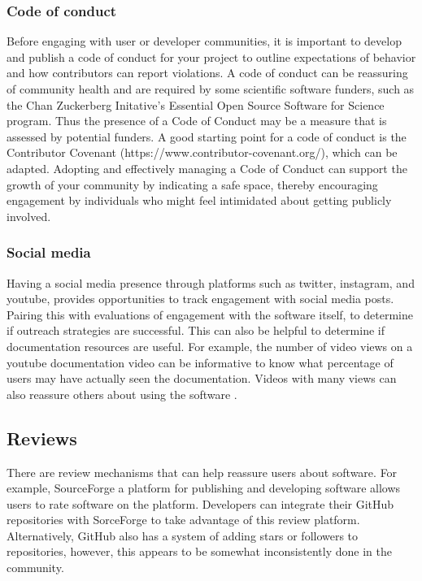 \subsubsection{Code of conduct}
Before engaging with user or developer communities, it is important to develop and publish a code of conduct for your project to outline expectations of behavior and how contributors can report violations. A code of conduct can be reassuring of community health and are required by some scientific software funders, such as the Chan Zuckerberg Initative’s Essential Open Source Software for Science program. Thus the presence of a Code of Conduct may be a measure that is assessed by potential funders. A good starting point for a code of conduct is the Contributor Covenant (https://www.contributor-covenant.org/), which can be adapted. Adopting and effectively managing\cite{aurora_how_2019} a  Code of Conduct can support the growth of your community by indicating a safe space, thereby encouraging engagement by individuals who might feel intimidated about getting publicly involved.

\subsubsection{Social media}
Having a social media presence through platforms such as twitter, instagram, and youtube, provides opportunities to track engagement with social media posts.  Pairing this with evaluations of engagement with the software itself, to determine if outreach strategies are successful. This can also be helpful to determine if documentation resources are useful. For example, the number of video views on a youtube documentation video can be informative to know what percentage of users may have actually seen the documentation. Videos with many views can also reassure others about using the software . 

\subsection{Reviews}
There are review mechanisms that can help reassure users about software. For example, SourceForge\cite{sourceforge} a platform for publishing and developing software allows users to rate software on the platform. Developers can integrate their GitHub repositories with SorceForge to take advantage of this review platform. Alternatively, GitHub also has a system of adding stars or followers to repositories, however, this appears to be somewhat inconsistently done in the community. 

